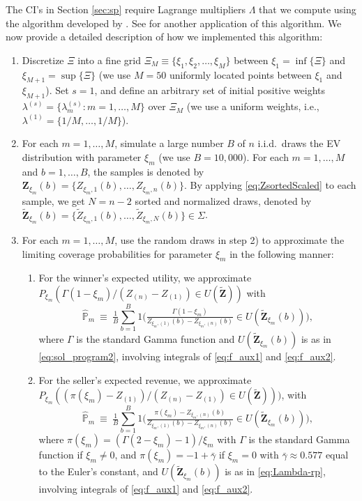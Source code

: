The CI's in Section \ref{sec:sp} require Lagrange multipliers $\Lambda$ that we compute using the algorithm developed by \citet{elliott2015}. See \citet{mullerwang2017} for another application of this algorithm. We now provide a detailed description of how we implemented this algorithm:
\begin{enumerate}[1)] 
\item Discretize $\Xi$ into a fine grid $\Xi _{M}\equiv \{\xi _{1},\xi _{2},\ldots ,\xi _{M}\}$ between $\xi _{1} = \inf\{\Xi\}$ and $\xi _{M+1} = \sup\{\Xi\}$ (we use $M = 50$ uniformly located points between $\xi _{1}$ and $\xi _{M+1}$). Set $s=1$, and define an arbitrary set of initial positive weights $\lambda^{(s)} = \{\lambda^{(s)}_{m}:m=1,\dots,M\}$ over $ \Xi _{M}$ (we use a uniform weights, i.e., $\lambda^{(1)} = \{1/M,\ldots ,1/M\}$).

\item For each $m=1,\dots ,M$, simulate a large number $B$ of $n$ i.i.d.\ draws the EV distribution with parameter $\xi _{m}$ (we use $B=10,000$). For each $m=1,\dots ,M$ and $b=1,\dots ,B$, the samples is denoted by $\mathbf{Z} _{\xi _{m}}(b) =\{Z_{\xi _{m},1}(b) ,\dots ,Z_{\xi _{m},n}(b) \}$. By applying \eqref{eq:ZsortedScaled} to each sample, we get $N=n-2$ sorted and normalized draws, denoted by $\tilde{\mathbf{Z}}_{\xi _{m}}(b) =\{\tilde{Z}_{\xi _{m},1}(b) ,\dots ,\tilde{Z}_{\xi _{m},N}(b) \}\in \Sigma $.

\item For each $m=1,\dots ,M$, use the random draws in step 2) to approximate the limiting coverage probabilities for parameter $\xi _{m}$ in the following manner:
\begin{enumerate}
\item For the winner's expected utility, we approximate ${P}_{\xi _{m}}({ \Gamma (1-\xi _{m})}/({Z_{(n)}-Z_{(1)}})\in U(\tilde{\mathbf{Z}}))$ with  
\[
\mathbb{\hat{P}}_{m}~\equiv ~\tfrac{1}{B}\sum_{b=1}^{B}1\big(\tfrac{\Gamma (1-\xi _{m})}{Z_{\xi _{m},(1)}(b) -Z_{\xi _{m},(n)}( b) }\in U(\tilde{\mathbf{Z}}_{\xi _{m}}(b) )\big),
\]
where $\Gamma $ is the standard Gamma function and $U(\tilde{\mathbf{Z}} _{\xi _{m}}(b) )$ is as in \eqref{eq:sol_program2}, involving integrals of \eqref{eq:f_aux1} and \eqref{eq:f_aux2}.

\item For the seller's expected revenue, we approximate ${P}_{\xi _{m}}(({ \pi (\xi _{m})-Z_{(1)}})/({Z_{(n)}-Z_{(1)}})\in U(\tilde{\mathbf{Z}})))$, with 
\[
\mathbb{\hat{P}}_{m}~\equiv ~\tfrac{1}{B}\sum_{b=1}^{B}1\big(\tfrac{\pi (\xi_{m})-Z_{\xi _{m},(n)}(b) }{Z_{\xi _{m},(1)}(b) -Z_{\xi _{m},(n)}(b) }\in U(\tilde{\mathbf{Z}}_{\xi _{m}}(b))
\big),
\]
where $\pi (\xi _{m})=(\Gamma (2-\xi _{m})-1)/\xi _{m}$ with $\Gamma $ is the standard Gamma function if $\xi _{m}\not=0$, and $\pi (\xi _{m})=-1+\bar{ \gamma}$ if $\xi _{m}=0$ with $\bar{\gamma}\approx 0.577$ equal to the Euler's constant, and $U(\tilde{\mathbf{Z}}_{\xi _{m}}(b) )$ is as in \eqref{eq:Lambda-rp}, involving integrals of \eqref{eq:f_aux1} and \eqref{eq:f_aux2}.
\end{enumerate}


\end{enumerate}
